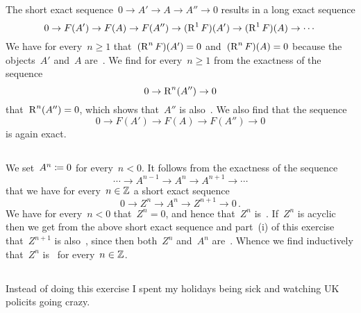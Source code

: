 \section{}





\subsection{}

The short exact sequence~$0 \to A' \to A \to A'' \to 0$ results in a long exact sequence
\[
  0
  \to
  F(A')
  \to
  F(A)
  \to
  F(A'')
  \to
  (\operatorname{R}^1 F)(A')
  \to
  (\operatorname{R}^1 F)(A)
  \to
  \dotsb
\]
We have for every~$n \geq 1$ that~$(\operatorname{R}^n F)(A') = 0$ and~$(\operatorname{R}^n F)(A) = 0$ because the objects~$A'$ and~$A$ are~.
We find for every~$n \geq 1$ from the exactness of the sequence
\[
  0
  \to
  \operatorname{R}^n(A'')
  \to
  0
\]
that~$\operatorname{R}^n(A'') = 0$, which shows that~$A''$ is also~.
We also find that the sequence
\[
  0
  \to
  F(A')
  \to
  F(A)
  \to
  F(A'')
  \to
  0
\]
is again exact.





\subsection{}

We set~$A^n \coloneqq 0$ for every~$n < 0$.
It follows from the exactness of the sequence
\[
  \dotsb
  \to
  A^{n-1}
  \to
  A^n
  \to
  A^{n+1}
  \to
  \dotsb
\]
that we have for every~$n \in \mathbb{Z}$ a short exact sequence
\[
  0
  \to
  Z^n
  \to
  A^n
  \to
  Z^{n+1}
  \to
  0 \,.
\]
We have for every~$n < 0$ that~$Z^n = 0$, and hence that~$Z^n$ is~.
If~$Z^n$ is acyclic then we get from the above short exact sequence and part~(i) of this exercise that~$Z^{n+1}$ is also~, since then both~$Z^n$ and~$A^n$ are~.
Whence we find inductively that~$Z^n$ is~ for every~$n \in \mathbb{Z}$.





\subsection{}

Instead of doing this exercise I spent my holidays being sick and watching UK policits going crazy.




